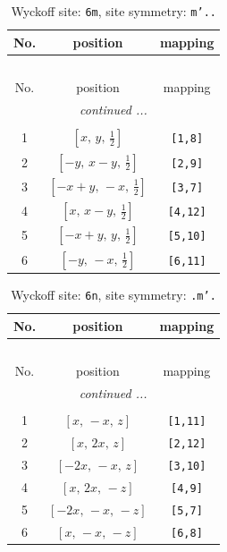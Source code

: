 \documentclass[fleqn,8pt]{jsarticle}
\begin{document}
\renewcommand{\arraystretch}{1.2}
\begin{longtable}{ccc}
\caption{Wyckoff site: {\tt 6m}, site symmetry: {\tt m'..}}
 \\
 \hline \hline
No. & position & mapping \\ \hline \endfirsthead

\multicolumn{2}{l}{\tablename\ \thetable{}} \\
 \hline \hline
No. & position & mapping \\ \hline \endhead

 \hline \hline
\multicolumn{2}{r}{\footnotesize\it continued ...} \\ \endfoot

 \hline \hline
\multicolumn{2}{r}{} \\ \endlastfoot

1 & $\left[ x,\, y,\, \frac{1}{2} \right]$ & {\tt [1,8]} \\ \hline
2 & $\left[ - y,\, x - y,\, \frac{1}{2} \right]$ & {\tt [2,9]} \\ \hline
3 & $\left[ - x + y,\, - x,\, \frac{1}{2} \right]$ & {\tt [3,7]} \\ \hline
4 & $\left[ x,\, x - y,\, \frac{1}{2} \right]$ & {\tt [4,12]} \\ \hline
5 & $\left[ - x + y,\, y,\, \frac{1}{2} \right]$ & {\tt [5,10]} \\ \hline
6 & $\left[ - y,\, - x,\, \frac{1}{2} \right]$ & {\tt [6,11]} \\
\end{longtable}
\renewcommand{\arraystretch}{1.2}
\begin{longtable}{ccc}
\caption{Wyckoff site: {\tt 6n}, site symmetry: {\tt .m'.}}
 \\
 \hline \hline
No. & position & mapping \\ \hline \endfirsthead

\multicolumn{2}{l}{\tablename\ \thetable{}} \\
 \hline \hline
No. & position & mapping \\ \hline \endhead

 \hline \hline
\multicolumn{2}{r}{\footnotesize\it continued ...} \\ \endfoot

 \hline \hline
\multicolumn{2}{r}{} \\ \endlastfoot

1 & $\left[ x,\, - x,\, z \right]$ & {\tt [1,11]} \\ \hline
2 & $\left[ x,\, 2 x,\, z \right]$ & {\tt [2,12]} \\ \hline
3 & $\left[ - 2 x,\, - x,\, z \right]$ & {\tt [3,10]} \\ \hline
4 & $\left[ x,\, 2 x,\, - z \right]$ & {\tt [4,9]} \\ \hline
5 & $\left[ - 2 x,\, - x,\, - z \right]$ & {\tt [5,7]} \\ \hline
6 & $\left[ x,\, - x,\, - z \right]$ & {\tt [6,8]} \\
\end{longtable}
\end{document}
